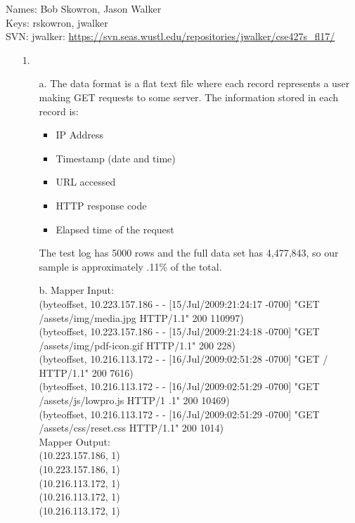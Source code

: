 \documentclass{article}
\begin{document}
\begin{flushleft}
Names: Bob Skowron, Jason Walker\\
Keys: rskowron, jwalker\\
SVN: jwalker: \url{https://svn.seas.wustl.edu/repositories/jwalker/cse427s_fl17/}\\
\end{flushleft}

\begin{itemize}
\item[1.] 
	\begin{itemize}
	\item[a.] The data format is a flat text file where each record represents a user making GET requests to some server. The information stored in each record is:\\
		\begin{itemize}
		\item IP Address
		\item Timestamp (date and time)
		\item URL accessed
		\item HTTP response code
		\item Elapsed time of the request
		\end{itemize}
	The test log has 5000 rows and the full data set has 4,477,843, so our sample is approximately .11\% of the total.	
	
	\item[b.] Mapper Input:\\
		(byteoffset, 10.223.157.186 - - [15/Jul/2009:21:24:17 -0700] "GET /assets/img/media.jpg HTTP/1.1" 200 110997)\\
		(byteoffset, 10.223.157.186 - - [15/Jul/2009:21:24:18 -0700] "GET /assets/img/pdf-icon.gif HTTP/1.1" 200 228)\\
		(byteoffset, 10.216.113.172 - - [16/Jul/2009:02:51:28 -0700] "GET / HTTP/1.1" 200 7616)\\
		(byteoffset, 10.216.113.172 - - [16/Jul/2009:02:51:29 -0700] "GET /assets/js/lowpro.js HTTP/1 .1" 200 10469)\\
		(byteoffset, 10.216.113.172 - - [16/Jul/2009:02:51:29 -0700] "GET /assets/css/reset.css HTTP/1.1" 200 1014)\\
		
	Mapper Output:\\
		(10.223.157.186, 1)\\
		(10.223.157.186, 1)\\
		(10.216.113.172, 1)\\
		(10.216.113.172, 1)\\
		(10.216.113.172, 1)\\


\end{itemize}
\end{itemize}
\end{document}
